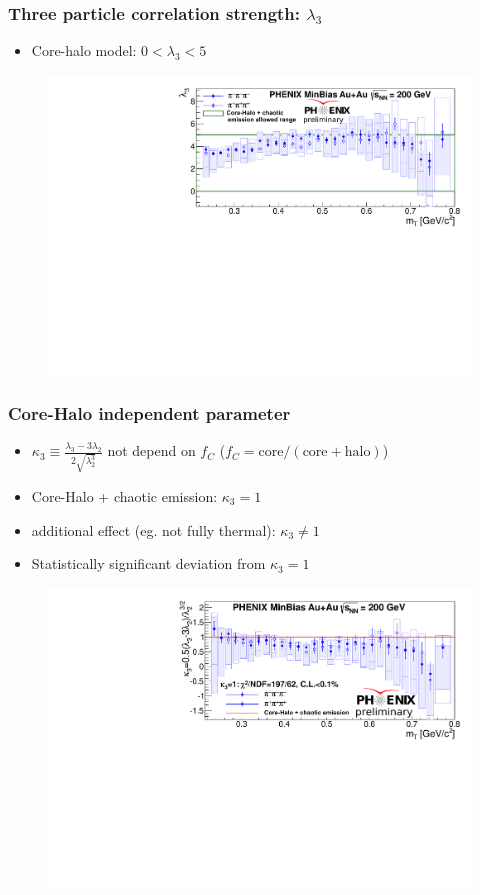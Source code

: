 \documentclass{beamer}
\begin{document}
\begin{frame}
\frametitle{Three particle correlation strength: $\lambda_3$}
\begin{itemize}
\setlength{\itemsep}{10pt}
\item Core-halo model: $0<\lambda_3<5$
\end{itemize}
\begin{figure}
\colorbox{white}{\includegraphics[scale=0.6]{pic/lambda3}}
\end{figure}
\end{frame}



\begin{frame}
\frametitle{Core-Halo independent parameter}
\begin{itemize}
\setlength{\itemsep}{4pt}
\item $\kappa_3\equiv\frac{\lambda_3-3\lambda_2}{2\sqrt{\lambda_2^3}}$ not depend on $f_C$ ($f_C=\mathrm{core}/(\mathrm{core}+\mathrm{halo})$)
\item Core-Halo + chaotic emission: $\kappa_3=1$
\item additional effect (eg. not fully thermal): $\kappa_3\neq 1$
\item Statistically significant deviation from $\kappa_3=1$
\end{itemize}
\begin{figure}
\includegraphics[scale=0.5]{pic/kappa3}
\end{figure}
\end{frame}
\end{document}
